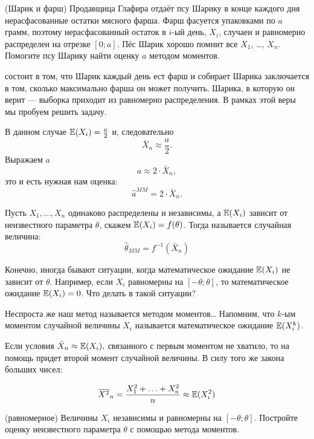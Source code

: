 \documentclass[12pt, a4paper, oneside]{article}
\begin{document}
\begin{problem}{(Шарик и фарш)}
Продавщица Глафира отдаёт псу Шарику в конце каждого дня нерасфасованные остатки мясного фарша. Фарш фасуется упаковками по $a$ грамм, поэтому нерасфасованный остаток в $i$-ый день, $X_i$, случаен и равномерно распределен на отрезке $[0;a]$. Пёс Шарик хорошо помнит все $X_1$, \ldots, $X_n$. Помогите псу Шарику найти оценку $a$ методом моментов.
\end{problem}

\begin{sol}
 состоит в том, что Шарик каждый день ест фарш и собирает   Шарика заключается в том, сколько максимально фарша он может получить.  Шарика, в которую он верит --- выборка приходит из равномерно распределения. В рамках этой веры мы пробуем решить задачу.

В данном случае $ \mathbb{E}(X_{i})=\frac{a}{2} $ и, следовательно
\[ \bar{X}_{n}\approx \frac{a}{2}. \]
Выражаем $a$
\[ a \approx 2 \cdot \bar{X}_{n}, \]
это и есть нужная нам оценка:
\[ \hat{a}^{MM}= 2 \cdot \bar{X}_{n}. \]
\end{sol}

\begin{definition} 
Пусть $X_1, \ldots, X_n$ одинаково распределены и независимы, а $\mathbb{E}(X_{i})$ зависит от неизвестного параметра $\theta$, скажем $\mathbb{E}(X_{i}) = f(\theta)$. Тогда  называется случайная величина:
\[ \hat{\theta}_{MM} = f^{-1}(\bar{X}_{n}) \]
\end{definition} 

Конечно, иногда бывают ситуации, когда математическое ожидание $\mathbb{E}(X_{i})$ не зависит от $\theta$. Например, если $X_{i}$ равномерны на $[-\theta; \theta]$, то математическое ожидание $\mathbb{E}(X_{i}) = 0$. Что делать в такой ситуации? 

Неспроста же наш метод называется методом моментов\ldots{}  Напомним, что $k$-ым моментом случайной величины $X_{i}$ называется математическое ожидание $\mathbb{E}(X_{i}^{k})$. 

Если условия $\bar{X}_{n}\approx \mathbb{E}(X_{i}),$ связанного с первым моментом не хватило, то на помощь придет второй момент случайной величины. В силу того же закона больших чисел:

\[\overline{X^2}_n = \frac{X_{1}^{2} + \ldots + X_{n}^{2}}{n} \approx \mathbb{E}(X_{i}^{2})\]

\begin{problem}{(равномерное)}
Величины $ X_{i} $ независимы и равномерны на $ [-\theta;\theta] $. Постройте оценку неизвестного параметра $ \theta $ с помощью метода моментов.
\end{problem}
\end{document}
